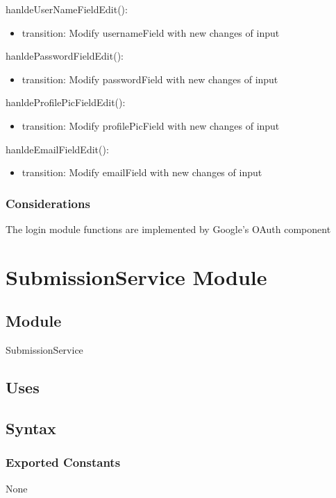 \documentclass[12pt, titlepage]{article}
\begin{document}
\noindent hanldeUserNameFieldEdit():
\begin{itemize}
\item transition: Modify usernameField with new changes of input
\end{itemize}

\noindent hanldePasswordFieldEdit():
\begin{itemize}
\item transition: Modify passwordField with new changes of input
\end{itemize}

\noindent hanldeProfilePicFieldEdit():
\begin{itemize}
\item transition: Modify profilePicField with new changes of input
\end{itemize}

\noindent hanldeEmailFieldEdit():
\begin{itemize}
\item transition: Modify emailField with new changes of input
\end{itemize}

\subsubsection{Considerations}

The login module functions are implemented by Google's OAuth component

\newpage

\section{SubmissionService Module} \label{SubmissionService}

\subsection{Module}

SubmissionService
\subsection{Uses}

\subsection{Syntax}

\subsubsection{Exported Constants}
None
\end{document}
